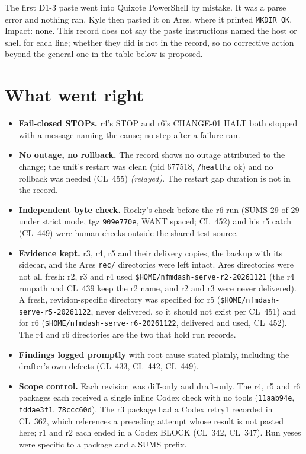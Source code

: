 \documentclass[10pt]{article}
\newcommand{\CL}[1]{CL~#1}
\newcommand{\relay}{\textit{(relayed)}}
\begin{document}
The first D1-3 paste went into Quixote PowerShell by mistake. It was a parse error and nothing ran. Kyle then pasted it on Ares, where it printed \texttt{MKDIR\_OK}. Impact: none. This record does not say the paste instructions named the host or shell for each line; whether they did is not in the record, so no corrective action beyond the general one in the table below is proposed.

\section{What went right}

\begin{itemize}[leftmargin=1.5em,itemsep=0.1em]
\item \textbf{Fail-closed STOPs.} r4's STOP and r6's CHANGE-01 HALT both stopped with a message naming the cause; no step after a failure ran.
\item \textbf{No outage, no rollback.} The record shows no outage attributed to the change; the unit's restart was clean (pid 677518, \texttt{/healthz} ok) and no rollback was needed (\CL{455}) \relay{}. The restart gap duration is not in the record.
\item \textbf{Independent byte check.} Rocky's check before the r6 run (SUMS 29 of 29 under strict mode, tgz \texttt{909e770e}, WANT spaced; \CL{452}) and his r5 catch (\CL{449}) were human checks outside the shared test source.
\item \textbf{Evidence kept.} r3, r4, r5 and their delivery copies, the backup with its sidecar, and the Ares \texttt{rec/} directories were left intact. Ares directories were not all fresh: r2, r3 and r4 used \texttt{\$HOME/nfmdash-serve-r2-20261121} (the r4 runpath and \CL{439} keep the r2 name, and r2 and r3 were never delivered). A fresh, revision-specific directory was specified for r5 (\texttt{\$HOME/nfmdash-serve-r5-20261122}, never delivered, so it should not exist per \CL{451}) and for r6 (\texttt{\$HOME/nfmdash-serve-r6-20261122}, delivered and used, \CL{452}). The r4 and r6 directories are the two that hold run records.
\item \textbf{Findings logged promptly} with root cause stated plainly, including the drafter's own defects (\CL{433}, \CL{442}, \CL{449}).
\item \textbf{Scope control.} Each revision was diff-only and draft-only. The r4, r5 and r6 packages each received a single inline Codex check with no tools (\texttt{11aab94e}, \texttt{fddae3f1}, \texttt{78ccc60d}). The r3 package had a Codex retry1 recorded in \CL{362}, which references a preceding attempt whose result is not pasted here; r1 and r2 each ended in a Codex BLOCK (\CL{342}, \CL{347}). Run yeses were specific to a package and a SUMS prefix.
\end{itemize}
\end{document}
